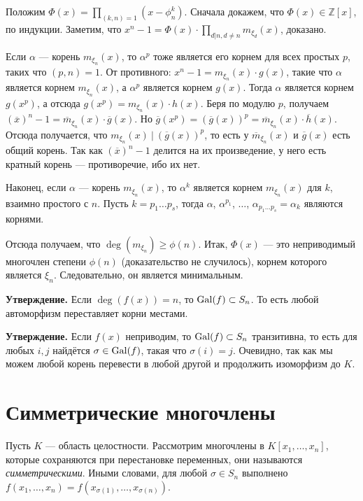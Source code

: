 Положим $\Phi(x) = \prod_{(k, n) = 1} (x - \phi_n^k)$.
Сначала докажем, что $\Phi(x) \in \mathbb Z[x]$, по индукции.
Заметим, что $x^n - 1 = \Phi(x) \cdot \prod_{d|n, d \ne n} m_{\xi_d}(x)$, доказано.

Если $\alpha$ --- корень $m_{\xi_n}(x)$, то $\alpha^p$ тоже является его корнем для всех простых $p$, таких что $(p, n) = 1$.
От противного: $x^n - 1 = m_{\xi_n}(x) \cdot g(x)$, такие что $\alpha$ является корнем $m_{\xi_n}(x)$, а $\alpha^p$ является корнем $g(x)$.
Тогда $\alpha$ является корнем $g(x^p)$, а отсюда $g(x^p) = m_{\xi_n}(x) \cdot h(x)$.
Беря по модулю $p$, получаем $(\overline x)^n - 1 = \overline m_{\xi_n}(x) \cdot \overline g(x)$.
Но $\overline g(x^p) = (\overline g(x))^p = \overline m_{\xi_n}(x) \cdot \overline h(x)$.
Отсюда получается, что $m_{\xi_n}(x)~|~(\overline g(x))^p$, то есть у $\overline m_{\xi_n}(x)$ и $\overline g(x)$ есть общий корень.
Так как $(\overline x)^n - 1$ делится на их произведение, у него есть кратный корень --- противоречие, ибо их нет.

Наконец, если $\alpha$ --- корень $m_{\xi_n}(x)$, то $\alpha^k$ является корнем $m_{\xi_n}(x)$ для $k$, взаимно простого с $n$.
Пусть $k = p_1 \dots p_s$, тогда $\alpha$, $\alpha^{p_1}$, $\dots$, $\alpha_{p_1 \dots p_s} = \alpha_k$ являются корнями.

Отсюда получаем, что $\deg(m_{\xi_n}) \ge \phi(n)$.
Итак, $\Phi(x)$ --- это неприводимый многочлен степени $\phi(n)$ (доказательство не случилось), корнем которого является $\xi_n$.
Следовательно, он является минимальным.

\QED

\textbf{Утверждение.} Если $\deg(f(x)) = n$, то $\operatorname{Gal}(f) \subset S_n$.
То есть любой автоморфизм переставляет корни местами.

\textbf{Утверждение.} Если $f(x)$ неприводим, то $\operatorname{Gal}(f) \subset S_n$ транзитивна, то есть для любых $i, j$ найдётся $\sigma \in \operatorname{Gal}(f)$, такая что $\sigma(i) = j$.
Очевидно, так как мы можем любой корень перевести в любой другой и продолжить изоморфизм до $K$.

\section{Симметрические многочлены}
Пусть $K$ --- область целостности.
Рассмотрим многочлены в $K[x_1, \dots, x_n]$, которые сохраняются при перестановке переменных, они называются \textit{симметрическими}.
Иными словами, для любой $\sigma \in S_n$ выполнено $f(x_1, \dots, x_n) = f(x_{\sigma(1)}, \dots, x_{\sigma(n)})$.

